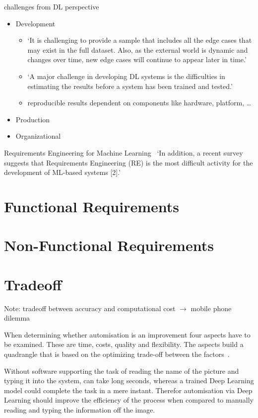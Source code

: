 challenges from DL perspective~\cite{arpteg_software_2018}
\begin{itemize}
    \item Development
        \begin{itemize}
            \item `It is challenging to provide a sample that includes all the edge cases that
                may exist in the full dataset. Also, as the external world is dynamic and changes
                over time, new edge cases will continue to appear later in time.'
            \item `A major challenge in developing DL systems is the difficulties in estimating
                the results before a system has been trained and tested.'
            \item reproducible results dependent on components like hardware, platform, \ldots
        \end{itemize}
    \item Production
    \item Organizational
\end{itemize}

Requirements Engineering for Machine Learning~\cite{vogelsang_requirements_2019}
`In addition, a recent survey suggests that Requirements Engineering (RE) is the most difficult
activity for the development of ML-based systems [2].'

\section{Functional Requirements}

\section{Non-Functional Requirements}

\section{Tradeoff}
Note: tradeoff between accuracy and computational cost $\rightarrow$ mobile phone dilemma

When determining whether automisation is an improvement four aspects have to be examined.
These are time, costs, quality and flexibility.
The aspects build a quadrangle that is based on the optimizing trade-off between the
factors~\cite{dumas_fundamentals_2013}.

Without software supporting the task of reading the name of the picture and typing it into
the system, can take long seconds, whereas a trained Deep Learning model could complete the task
in a mere instant.
Therefor automisation via Deep Learning should improve the efficiency of the process when compared to
manually reading and typing the information off the image.

